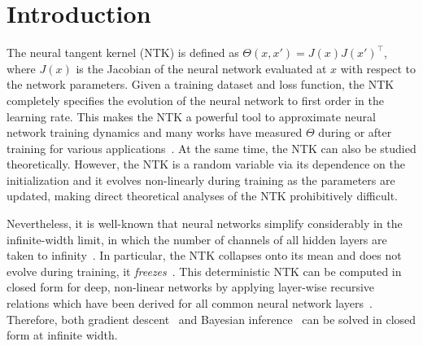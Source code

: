 \section{Introduction}
\label{sec:intro}

The neural tangent kernel (NTK) is defined as $\Theta(x,x')=J(x)J(x')^{\top}$, where $J(x)$ is the Jacobian of the neural network evaluated at $x$ with respect to the network parameters. Given a training dataset and loss function, the NTK completely specifies the evolution of the neural network to first order in the learning rate. This makes the NTK a powerful tool to approximate neural network training dynamics and many works have measured $\Theta$ during or after training for various applications~\cite{hayase2022, mok2022, engel2023a, zhou2024, wilson2025}. At the same time, the NTK can also be studied theoretically. However, the NTK is a random variable via its dependence on the initialization and it evolves non-linearly during training as the parameters are updated, making direct theoretical analyses of the NTK prohibitively difficult.

Nevertheless, it is well-known that neural networks simplify considerably in the infinite-width limit, in which the number of channels of all hidden layers are taken to infinity~\cite{neal1996, lee2018, matthews2018}. In particular, the NTK collapses onto its mean and does not evolve during training, it \emph{freezes}~\cite{jacot2018}. This deterministic NTK can be computed in closed form for deep, non-linear networks by applying layer-wise recursive relations which have been derived for all common neural network layers~\cite{novak2020a}. Therefore, both gradient descent~\cite{jacot2018} and Bayesian inference~\cite{he2020} can be solved in closed form at infinite width.




